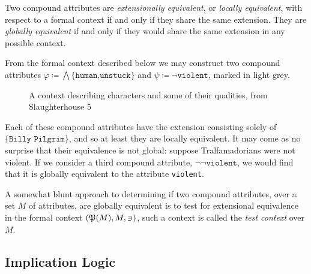 \begin{definition}
	\label{definition:equivalence-compound-attributes}

	Two compound attributes are \textit{extensionally equivalent}, or \textit{locally equivalent}, with respect to a
	formal context if and only if they share the same extension. They are \textit{globally equivalent} if and only if they
	would share the same extension in any possible context.
\end{definition}

\begin{example}
	From the formal context described below we may construct two compound attributes $\varphi \coloneqq \bigwedge \{\texttt
	{human,unstuck}\}$ and $\psi \coloneqq \neg \texttt{violent}$, marked in light grey.
	\begin{figure}[H]
		\centering
		\small
		\begin{cxt}
			\label{cxt:slaughterhouse5}   
			   \atr{\textcolor{gray!70}{$\varphi$}}\atr{\textcolor{gray!70}{$\psi$}}

			   
		\end{cxt}
		\caption{A context describing characters and some of their qualities, from Slaughterhouse 5}
		\label{figure:context-slaughterhouse5}
	\end{figure}
	Each of these compound attributes have the extension consisting solely of $\{\texttt{Billy Pilgrim}\}$, and so at
	least they are locally equivalent. It may come as no surprise that their equivalence is not global: suppose
	Tralfamadorians were not violent. If we consider a third compound attribute, $\neg \neg \texttt{violent}$, we would find
	that it is globally equivalent to the attribute \texttt{violent}.
\end{example}

A somewhat blunt approach to determining if two compound attributes, over a set $M$ of attributes, are globally
equivalent is to test for extensional equivalence in the formal context $(\mathfrak{P}({M}), M, \ni)$, such a context is called the
\textit{test context} over $M$.

\subsection{Implication Logic}
\label{subsection:implication-logic}

